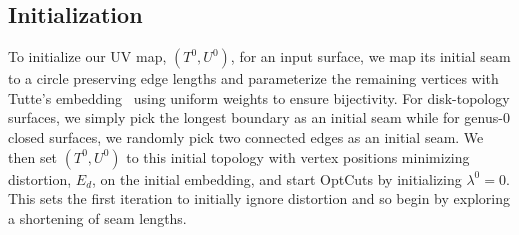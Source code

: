 \subsection{Initialization}
To initialize our UV map, $(T^0,U^0)$, for an input surface, we map its initial seam to a circle preserving edge lengths and parameterize the remaining vertices with Tutte's embedding~ using uniform weights to ensure bijectivity.
For disk-topology surfaces, we simply pick the longest boundary as an initial seam while for genus-0 closed surfaces, we randomly pick two connected edges as an initial seam. 
We then set $(T^0,U^0)$ to this initial topology with vertex positions minimizing distortion, $E_d$, on the initial embedding, and start OptCuts by initializing $\lambda^0 = 0$. This sets the first iteration to initially ignore distortion and so begin by exploring a shortening of seam lengths.%




